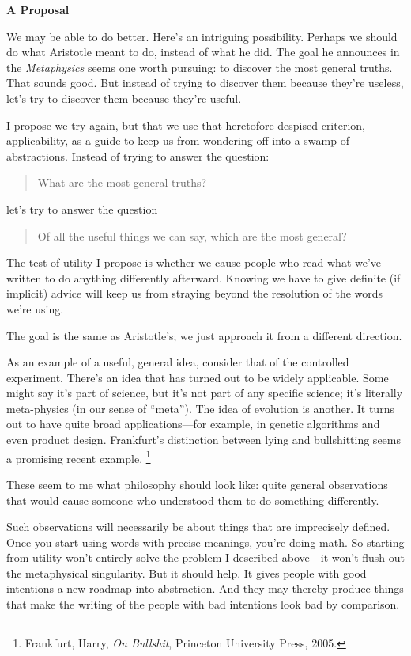 \textbf{A Proposal}

We may be able to do better. Here's an intriguing possibility. Perhaps
we should do what Aristotle meant to do, instead of what he did. The
goal he announces in the \emph{Metaphysics} seems one worth pursuing: to
discover the most general truths. That sounds good. But instead of
trying to discover them because they're useless, let's try to discover
them because they're useful.

I propose we try again, but that we use that heretofore despised
criterion, applicability, as a guide to keep us from wondering off into
a swamp of abstractions. Instead of trying to answer the question:

\begin{quote}
What are the most general truths?
\end{quote}

let's try to answer the question

\begin{quote}
Of all the useful things we can say, which are the most general?
\end{quote}

The test of utility I propose is whether we cause people who read what
we've written to do anything differently afterward. Knowing we have to
give definite (if implicit) advice will keep us from straying beyond the
resolution of the words we're using.

The goal is the same as Aristotle's; we just approach it from a
different direction.

As an example of a useful, general idea, consider that of the controlled
experiment. There's an idea that has turned out to be widely applicable.
Some might say it's part of science, but it's not part of any specific
science; it's literally meta-physics (in our sense of ``meta''). The
idea of evolution is another. It turns out to have quite broad
applications---for example, in genetic algorithms and even product
design. Frankfurt's distinction between lying and bullshitting seems a
promising recent example. \footnote{Frankfurt, Harry, \emph{On Bullshit}, Princeton University
Press, 2005.}

These seem to me what philosophy should look like: quite general
observations that would cause someone who understood them to do
something differently.

Such observations will necessarily be about things that are imprecisely
defined. Once you start using words with precise meanings, you're doing
math. So starting from utility won't entirely solve the problem I
described above---it won't flush out the metaphysical singularity. But
it should help. It gives people with good intentions a new roadmap into
abstraction. And they may thereby produce things that make the writing
of the people with bad intentions look bad by comparison.

